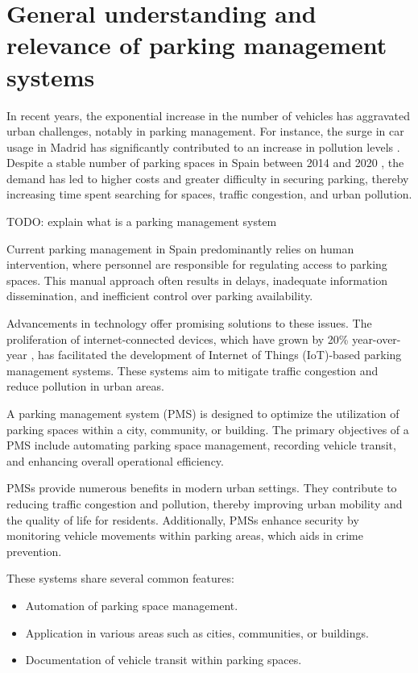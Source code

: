 \documentclass[oneside, 12pt, a4paper, draft]{book}
\begin{document}
\chapter{General understanding and relevance of parking management systems}
\label{sec:org2e7d34c}
In recent years, the exponential increase in the number of vehicles has aggravated urban challenges, notably in parking management. For instance, the surge in car usage in Madrid has significantly contributed to an increase in pollution levels \autocite{environmental_imapct_madrid_central}. Despite a stable number of parking spaces in Spain between 2014 and 2020 \autocite{urban_mobility_trends}, the demand has led to higher costs and greater difficulty in securing parking, thereby increasing time spent searching for spaces, traffic congestion, and urban pollution.

TODO: explain what is a parking management system

Current parking management in Spain predominantly relies on human intervention, where personnel are responsible for regulating access to parking spaces. This manual approach often results in delays, inadequate information dissemination, and inefficient control over parking availability.

Advancements in technology offer promising solutions to these issues. The proliferation of internet-connected devices, which have grown by 20\% year-over-year \autocite{iot_growth}, has facilitated the development of Internet of Things (IoT)-based parking management systems. These systems aim to mitigate traffic congestion and reduce pollution in urban areas.

A parking management system (PMS) is designed to optimize the utilization of parking spaces within a city, community, or building. The primary objectives of a PMS include automating parking space management, recording vehicle transit, and enhancing overall operational efficiency.

PMSs provide numerous benefits in modern urban settings. They contribute to reducing traffic congestion and pollution, thereby improving urban mobility and the quality of life for residents. Additionally, PMSs enhance security by monitoring vehicle movements within parking areas, which aids in crime prevention.

These systems share several common features:
\begin{itemize}
\item Automation of parking space management.
\item Application in various areas such as cities, communities, or buildings.
\item Documentation of vehicle transit within parking spaces.
\end{itemize}
\end{document}
